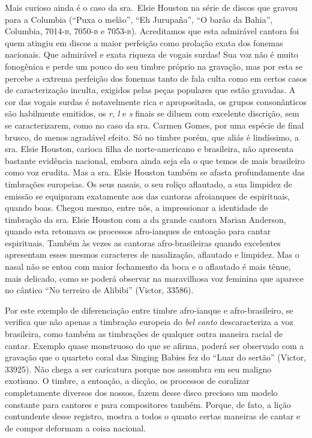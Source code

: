 Mais curioso ainda é o caso da sra.\, Elsie Houston na série de discos que
gravou para a Columbia (``Puxa o melão'', ``Eh Jurupaña'', ``O barão da
Bahia'', Columbia, 7014-\textsc{b}, 7050-\textsc{b} e 7053-\textsc{b}). Acreditamos que esta
admirável cantora foi quem atingiu em discos a maior perfeição como
prolação exata dos fonemas nacionais. Que admirável e exata riqueza de
vogais surdas! Sua voz não é muito fonogênica e perde um pouco do seu
timbre próprio na gravação, mas por esta se percebe a extrema perfeição
dos fonemas tanto de fala culta como em certos casos de caracterização
inculta, exigidos pelas peças populares que estão gravadas. A cor das
vogais surdas é notavelmente rica e apropositada, os grupos
consonânticos são habilmente emitidos, os \textit{r}, \textit{l} e \textit{s} finais se diluem com
excelente discrição, sem se caracterizarem, como no caso da sra.\,\,Carmen
Gomes, por uma espécie de final brusco, de menos agradável efeito. Só no
timbre porém, que aliás é lindíssimo, a sra.\,\,Elsie Houston, carioca
filha de norte-americano e brasileira, não apresenta bastante evidência
nacional, embora ainda seja ela o que temos de mais brasileiro como voz
erudita. Mas a sra.\,\,Elsie Houston também se afasta profundamente das
timbrações europeias. Os seus nasais, o seu roliço aflautado, a sua
limpidez de emissão se equiparam exatamente aos das cantoras afroianques
de espirituais, quando boas. Chegou mesmo, entre nós, a impressionar a
identidade de timbração da sra.\,\,Elsie Houston com a da grande cantora
Marian Anderson, quando esta retomava os processos afro-ianques de
entoação para cantar espirituais. Também às vezes as cantoras
afro-brasileiras quando excelentes apresentam esses mesmos caracteres de
nasalização, aflautado e limpidez. Mas o nasal não se entoa com maior
fechamento da boca e o aflautado é mais tênue, mais delicado, como se
poderá observar na maravilhosa voz feminina que aparece no cântico ``No
terreiro de Alibibi'' (Victor, 33586).

Por este exemplo de diferenciação entre timbre afro-ianque e
afro-brasileiro, se verifica que não apenas a timbração europeia do \textit{bel
canto} descaracteriza a voz brasileira, como também as timbrações de
qualquer outra maneira racial de cantar. Exemplo quase monstruoso do que
se afirma, poderá ser observado com a gravação que o quarteto coral das
Singing Babies fez do ``Luar do sertão'' (Victor, 33925). Não chega a
ser caricatura porque nos assombra em seu maligno exotismo. O timbre, a
entoação, a dicção, os processos de coralizar completamente diversos dos
nossos, fazem desse disco precioso um modelo constante para cantores e
para compositores também. Porque, de fato, a lição contundente desse
registro, mostra a todos o quanto certas maneiras de cantar e de compor
deformam a coisa nacional.

